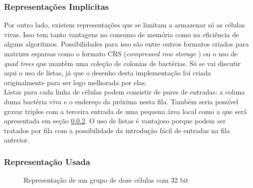 \subsubsection{Representações Implícitas}

Por outro lado, existem representações que se limitam a armazenar só as células vivas. Isso tem tanto vantagens no consumo de memória como na eficiência de alguns algoritmos. Possibilidades para isso são entre outros formatos criados para matrizes esparsas como o formato CRS (\textit{compressed row storage }) ou o uso de \textit{quad trees} que mantêm uma coleção de colonias de bactérias. Só se vai discutir aqui o uso de listas, já  que o desenho desta implementação foi criada originalmente para ser logo  melhorada por elas. \\

Listas para cada linha de células podem consistir de pares de entradas: a coluna duma bactéria viva e o endereço da próxima nesta fila. Também seria possível gravar triples com a terceira entrada de uma pequena área local como a que será apresentada em seção \ref{sec:representacao_usada}. O uso de listas é vantajoso porque podem ser tratados por fila com a possibilidade da introdução fácil de entradas na fila anterior. 


\subsubsection{Representação Usada}
\label{sec:representacao_usada}

\begin{figure}[h]
\centering

\caption{Representação de um grupo de doze células com 32 bit }
\label{fig:representacao}
\end{figure}

